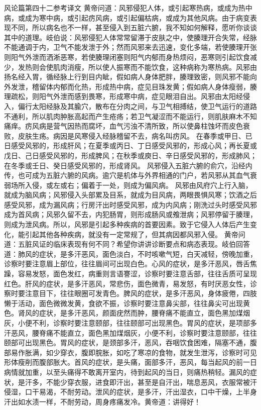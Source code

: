 \documentclass[a4paper,12pt,UTF8,twoside]{ctexbook}
\begin{document}
风论篇第四十二参考译文
黄帝问道：风邪侵犯人体，或引起寒热病，或成为热中病，或成为寒中病，或引起疠风病，或引起偏枯病，或成为其他风病。由于病变表现不同，所以病名也不一样，甚至侵入到五脏六腑，我不知如何解释，愿听你谈谈其中的道理。岐伯说：风邪侵犯人体常常留滞于皮肤之中，使腠理开合失常，经脉不能通调于内，卫气不能发泄于外；然而风邪来去迅速，变化多端，若使腠理开张则阳气外泄而洒淅恶寒，若使腠理闭塞则阳气内郁而身热烦闷，恶寒则引起饮食减少，发热则会使肌肉消瘦，所以使人振寒而不能饮食，这种病称为寒热病。风邪由扬名经入胃，循经脉上行到目内眦，假如病人身体肥胖，腠理致密，则风邪不能向外发泄，稽留体内郁而化热，形成热中病，症见目珠发黄；假如病人身体瘦弱，腠理疏松，则阳气外泄而感到畏寒，形成寒中病，症见眼泪自出。风邪由太阳经侵入，偏行太阳经脉及其腧穴，散布在分肉之间，与卫气相搏结，使卫气运行的道路不通利，所以肌肉肿胀高起而产生疮疡；若卫气凝涩而不能运行，则肌肤麻木不知痛痒。疠风病是营气因热而腐坏，血气污浊不清所致，所以使鼻柱蚀坏而皮色衰败，皮肤生疡。病因是风寒侵入经脉稽留不去，病名叫疠风。
在春季或甲日、已日感受风邪的，形成肝风；在夏季或丙日、丁日感受风邪的，形成心风；再长夏或戊日、己日感受风邪的，形成脾风；在秋季或庾日、辛日感受风邪的，形成肺风；在冬季或壬日、癸日感受风邪的，形成肾风。
风邪侵入五脏六腑的俞穴，沿经内传，也可成为五脏六腑的风病。逾穴是机体与外界相通的门户，若风邪从其血气衰弱场所入侵，或左或右；偏着于一处，则成为偏风病。
风邪由风府穴上行入脑，就成为脑风病；风邪侵入头部累及目系，就成为目风病，两眼畏惧风寒；饮酒之后感受风邪，成为漏风病；行房汗出时感受风邪，成为内风病；刚洗过头时感受风邪成为首风病；风邪久留不去，内犯肠胃，则形成肠风或飧泄病；风邪停留于腠理，则成为泄风病。所以，风邪是引起多种疾病的首要因素。致于它侵入人体后产生变化，能引起其他各种疾病，就没有一定常规了，但其病因都风邪入侵。
黄帝问道：五脏风证的临床表现有何不同？希望你讲讲诊断要点和病态表现。岐伯回答道：肺风的症状，是多汗恶风，面色淡白，不时咳嗽气短，白天减轻，傍晚加重，诊察时要注意眉上部位，往往眉间可出现白色。心风的症状，是多汗恶风，唇舌焦躁，容易发怒，面色发红，病重则言语謇涩，诊察时要注意舌部，往往舌质可呈现红色。肝风的症状，是多汗恶风，常悲伤，面色微青，易发怒，有时厌恶女性，诊察时要注意目下，往往眼圈可发青色。脾风的症状，是多汗恶风，身体疲倦，四肢懒于活动，面色微微发黄，食欲不振，诊察时要注意鼻尖部，往往鼻尖可出现黄色。肾风的症状，是多汗恶风，颜面疣然而肿，腰脊痛不能直立，面色黑加煤烟灰，小便不利，诊察时要注意颐部，往往颐部可出现黑色。胃风的症状，是项部多汗恶风，腰脊痛不能直立，面色黑加煤烟灰，小便不利，诊察时要注意颐部，往往颐部可出现黑色。胃风的症状，是颈部多汗，恶风，吞咽饮食困难，隔塞不通，腹部易作胀满，如少穿衣，腹即脘胀，如吃了寒凉的食物，就发生泄泻，诊察时可见形体瘦削而腹部胀大。首风的症状，是头痛，面部多汗，恶风，每当起风的前一日病情就加重，以至头痛得不敢离开室内，待到起风的当日，则痛热稍轻。漏风的症状，是汗多，不能少穿衣服，进食即汗出，甚至是自汗出，喘息恶风，衣服常被汗侵湿，口干易渴，不耐劳动。泄风的症状，是多汗，汗出湿衣，口中干燥，上半身汗出如水渍一样，不耐劳动，周身疼痛发冷。黄帝道：讲得好！
\end{document}

